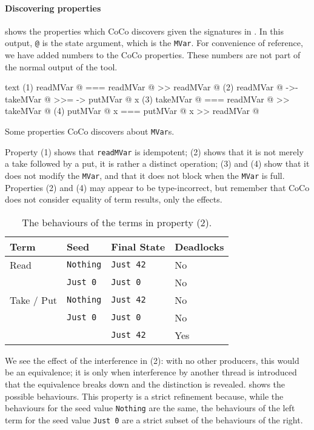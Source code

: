 \paragraph{Discovering properties}
 shows the properties which CoCo discovers given
the signatures in .  In this output, \verb|@| is the
state argument, which is the \verb|MVar|.  For convenience of
reference, we have added numbers to the CoCo properties.  These
numbers are not part of the normal output of the tool.

\begin{listing}
\centering
\begin{cminted}{text}
(1)   readMVar @  ===  readMVar @ >> readMVar @
(2)   readMVar @  ->-  takeMVar @ >>= \x -> putMVar @ x
(3)   takeMVar @  ===  readMVar @ >> takeMVar @
(4)  putMVar @ x  ===  putMVar @ x >> readMVar @
\end{cminted}
\caption{Some properties CoCo discovers about \texttt{MVar}s.}\label{lst:mvar_props1}
\end{listing}

Property (1) shows that \verb|readMVar| is idempotent; (2) shows that
it is not merely a take followed by a put, it is rather a distinct
operation; (3) and (4) show that it does not modify the \verb|MVar|,
and that it does not block when the \verb|MVar| is full.  Properties
(2) and (4) may appear to be type-incorrect, but remember that CoCo
does not consider equality of term results, only the effects.

\begin{table}[t]
\centering
\begin{tabular}{p{7.5em}p{7.5em}p{7.5em}p{7.5em}} \toprule
  Term       & Seed           & Final State & Deadlocks \\ \midrule
  Read       & \verb|Nothing| & \verb|Just 42| & No  \\
             & \verb|Just 0|  & \verb|Just 0|  & No  \\
  Take / Put & \verb|Nothing| & \verb|Just 42| & No  \\
             & \verb|Just 0|  & \verb|Just 0|  & No  \\
             &                & \verb|Just 42| & Yes \\ \bottomrule
\end{tabular}
\caption{The behaviours of the terms in property (2).}
\label{tbl:behaviours}
\end{table}

We see the effect of the interference in (2): with no other producers,
this would be an equivalence; it is only when interference by another
thread is introduced that the equivalence breaks down and the
distinction is revealed.   shows the possible
behaviours.  This property is a strict refinement because, while the
behaviours for the seed value \verb|Nothing| are the same, the
behaviours of the left term for the seed value \verb|Just 0| are a
strict subset of the behaviours of the right.


